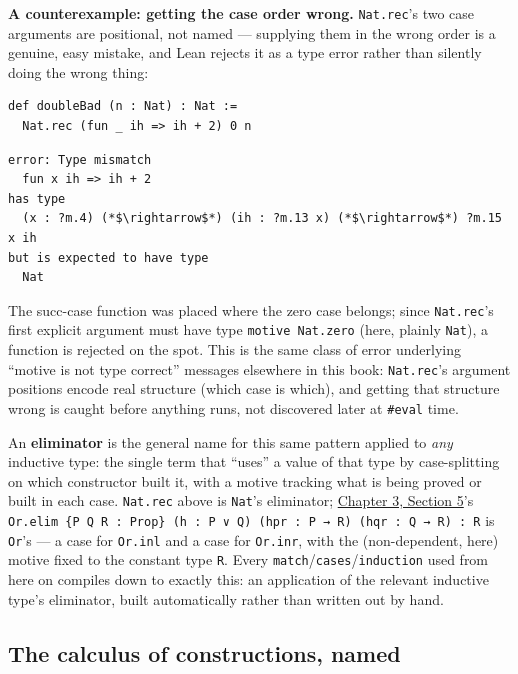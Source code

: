 \textbf{A counterexample: getting the case order wrong.} \texttt{Nat.rec}'s two case arguments are positional, not named --- supplying them in the wrong order is a genuine, easy mistake, and Lean rejects it as a type error rather than silently doing the wrong thing:

\begin{lstlisting}
def doubleBad (n : Nat) : Nat :=
  Nat.rec (fun _ ih => ih + 2) 0 n
\end{lstlisting}

\begin{lstlisting}
error: Type mismatch
  fun x ih => ih + 2
has type
  (x : ?m.4) (*$\rightarrow$*) (ih : ?m.13 x) (*$\rightarrow$*) ?m.15 x ih
but is expected to have type
  Nat
\end{lstlisting}

The succ-case function was placed where the zero case belongs; since \texttt{Nat.rec}'s first explicit argument must have type \texttt{motive Nat.zero} (here, plainly \texttt{Nat}), a function is rejected on the spot. This is the same class of error underlying ``motive is not type correct'' messages elsewhere in this book: \texttt{Nat.rec}'s argument positions encode real structure (which case is which), and getting that structure wrong is caught before anything runs, not discovered later at \texttt{\#eval} time.

An \textbf{eliminator} is the general name for this same pattern applied to \emph{any} inductive type: the single term that ``uses'' a value of that type by case-splitting on which constructor built it, with a motive tracking what is being proved or built in each case. \texttt{Nat.rec} above is \texttt{Nat}'s eliminator; \hyperref[sec:03-propositions-and-proofs:05-and-or-not:1]{Chapter 3, Section 5}'s \texttt{Or.elim \{P Q R : Prop\} (h : P ∨ Q) (hpr : P → R) (hqr : Q → R) : R} is \texttt{Or}'s --- a case for \texttt{Or.inl} and a case for \texttt{Or.inr}, with the (non-dependent, here) motive fixed to the constant type \texttt{R}. Every \texttt{match}/\texttt{cases}/\texttt{induction} used from here on compiles down to exactly this: an application of the relevant inductive type's eliminator, built automatically rather than written out by hand.

\subsection{The calculus of constructions, named}\label{sec:01-basics:05-pi-sigma-and-coc:7}

